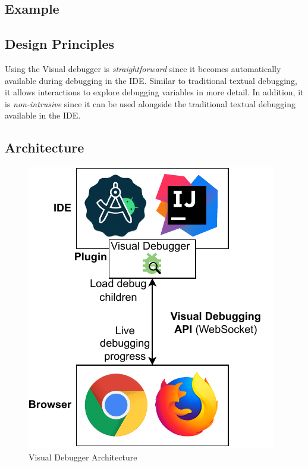 \documentclass[sigconf]{acmart}
\begin{document}
\subsection{Example}




\subsection{Design Principles}
Using the Visual debugger is \textit{straightforward} since it becomes automatically available during debugging in the IDE.
Similar to traditional textual debugging, it allows interactions to explore debugging variables in more detail.
In addition, it is \textit{non-intrusive} since it can be used alongside the traditional textual debugging available in the IDE.


\subsection{Architecture}

\begin{figure}[ht]
  \centering
  \includegraphics[width=0.7\linewidth]{images/visual-debugger.pdf}
  \caption{Visual Debugger Architecture}
\end{figure}
\end{document}
